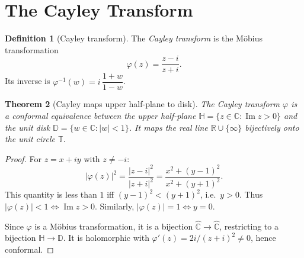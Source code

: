 \documentclass[12pt,a4paper,openany]{book}
\theoremstyle{definition}
\newtheorem{definition}{Definition}[chapter]
\theoremstyle{plain}
\newtheorem{theorem}[definition]{Theorem}
\theoremstyle{remark}
\newcommand{\C}{\mathbb{C}}
\newcommand{\R}{\mathbb{R}}
\newcommand{\D}{\mathbb{D}}
\newcommand{\T}{\mathbb{T}}
\DeclareMathOperator{\im}{Im}
\newcommand{\abs}[1]{\left|#1\right|}
\begin{document}
\section{The Cayley Transform}\label{sec:cayley}

\begin{definition}[Cayley transform]\label{def:cayley}
The \emph{Cayley transform} is the M\"obius transformation
\[
  \varphi(z)=\frac{z-i}{z+i}.
\]
Its inverse is $\varphi^{-1}(w)=i\,\dfrac{1+w}{1-w}$.
\end{definition}

\begin{theorem}[Cayley maps upper half-plane to disk]\label{thm:cayley}
The Cayley transform $\varphi$ is a conformal equivalence between the
upper half-plane $\mathbb{H}=\{z\in\C:\im z>0\}$ and the unit disk
$\D=\{w\in\C:\abs{w}<1\}$.  It maps the real line
$\R\cup\{\infty\}$ bijectively onto the unit circle $\T$.
\end{theorem}

\begin{proof}
For $z=x+iy$ with $z\neq -i$:
\[
  \abs{\varphi(z)}^2=\frac{\abs{z-i}^2}{\abs{z+i}^2}
  =\frac{x^2+(y-1)^2}{x^2+(y+1)^2}.
\]
This quantity is less than $1$ iff $(y-1)^2<(y+1)^2$, i.e.\ $y>0$.
Thus $\abs{\varphi(z)}<1\Leftrightarrow\im z>0$.  Similarly,
$\abs{\varphi(z)}=1\Leftrightarrow y=0$.

Since $\varphi$ is a M\"obius transformation, it is a bijection
$\hat{\C}\to\hat{\C}$, restricting to a bijection $\mathbb{H}\to\D$.
It is holomorphic with $\varphi'(z)=2i/(z+i)^2\neq 0$, hence conformal.
\end{proof}
\end{document}
